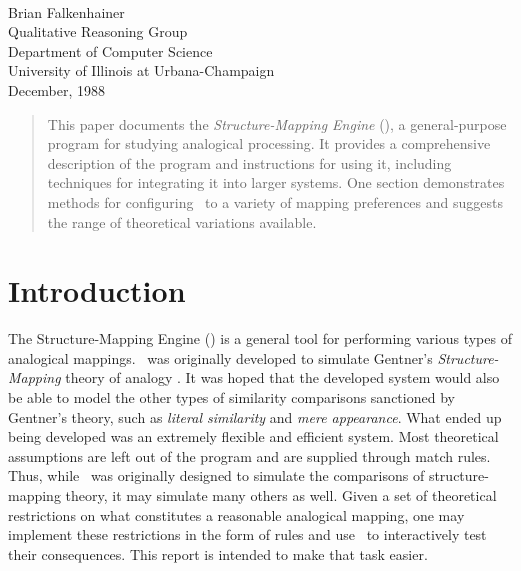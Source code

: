 \begin{titlepage}
{}
\ \ \ \vspace{0.5in} \\
{}
\vspace{0.7in}
\begin{center}
            {\Large Brian Falkenhainer}       \\[2ex]
{\large     Qualitative Reasoning Group       \\
          Department of Computer Science      \\
         University of Illinois at Urbana-Champaign \\
\vspace{0.75in}
                December, 1988 \\ }
\end{center}
\vspace{0.75in}
\begin{abstract}
This paper documents the {\it Structure-Mapping Engine} (\SME), a
general-purpose program for studying analogical processing.  It provides a
comprehensive description of the program and instructions for using it,
including techniques for integrating it into larger systems. One section
demonstrates methods for configuring \SME\ to a variety of mapping
preferences and suggests the range of theoretical variations available.
\end{abstract}

\end{titlepage}
\tableofcontents
{}
\newpage
{}

\section{Introduction}

The Structure-Mapping Engine (\SME) is a general tool for performing various
types of analogical mappings. \SME\ was originally developed to simulate
Gentner's {\it Structure-Mapping} theory of analogy
\cite{smt-cogsci,allerton,analogica}. It was hoped that the developed system
would also be able to model the other types of similarity comparisons
sanctioned by Gentner's theory, such as {\it literal similarity} and {\it
mere appearance}. What ended up being developed was an extremely flexible
and efficient system. Most theoretical assumptions are left out of the
program and are supplied through match rules. Thus, while \SME\ was
originally designed to simulate the comparisons of structure-mapping theory,
it may simulate many others as well. Given a set of theoretical restrictions
on what constitutes a reasonable analogical mapping, one may implement these
restrictions in the form of rules and use \SME\ to interactively test their
consequences. This report is intended to make that task easier.

